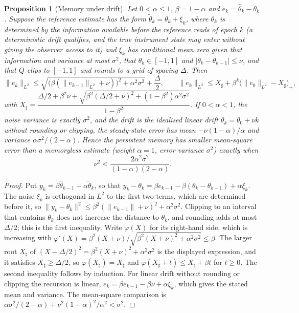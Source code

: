 \documentclass[12pt]{article}
\newtheorem{proposition}[theorem]{Proposition}
\theoremstyle{definition}
\begin{document}
\begin{proposition}[Memory under drift]\label{prop:memory_drift}
Let $0<\alpha\le1$, $\beta=1-\alpha$ and $e_k=\hat\theta_k-\theta_k$. Suppose the reference estimate has the form $\tilde\theta_k=\theta_k+\xi_k$, where $\theta_k$ is determined by the information available before the reference reads of epoch $k$ (a deterministic drift qualifies, and the true instrument state may enter without giving the observer access to it) and $\xi_k$ has conditional mean zero given that information and variance at most $\sigma^2$, that $\theta_k\in[-1,1]$ and $|\theta_k-\theta_{k-1}|\le\nu$, and that $Q$ clips to $[-1,1]$ and rounds to a grid of spacing $\Delta$. Then
\[
\|e_k\|_{L^2}\le\sqrt{\bigl(\beta(\|e_{k-1}\|_{L^2}+\nu)\bigr)^2+\alpha^2\sigma^2}+\frac\Delta2,
\qquad
\|e_k\|_{L^2}\le X_\sharp+\beta^k\bigl(\|e_0\|_{L^2}-X_\sharp\bigr)_+,
\]
with $X_\sharp=\dfrac{\Delta/2+\beta^2\nu+\sqrt{\beta^2(\Delta/2+\nu)^2+(1-\beta^2)\alpha^2\sigma^2}}{1-\beta^2}$. If $0<\alpha<1$, the noise variance is exactly $\sigma^2$, and the drift is the idealised linear drift $\theta_k=\theta_0+\nu k$ without rounding or clipping, the steady-state error has mean $-\nu(1-\alpha)/\alpha$ and variance $\alpha\sigma^2/(2-\alpha)$. Hence the persistent memory has smaller mean-square error than a memoryless estimate (weight $\alpha=1$, error variance $\sigma^2$) exactly when
\[
\nu^2<\frac{2\alpha^2\sigma^2}{(1-\alpha)(2-\alpha)}.
\]
\end{proposition}
\begin{proof}
Put $y_k=\beta\hat\theta_{k-1}+\alpha\tilde\theta_k$, so that $y_k-\theta_k=\beta e_{k-1}-\beta(\theta_k-\theta_{k-1})+\alpha\xi_k$. The noise $\xi_k$ is orthogonal in $L^2$ to the first two terms, which are determined before it, so $\|y_k-\theta_k\|^2\le\beta^2(\|e_{k-1}\|+\nu)^2+\alpha^2\sigma^2$. Clipping to an interval that contains $\theta_k$ does not increase the distance to $\theta_k$, and rounding adds at most $\Delta/2$; this is the first inequality. Write $\varphi(X)$ for its right-hand side, which is increasing with $\varphi'(X)=\beta^2(X+\nu)/\sqrt{\beta^2(X+\nu)^2+\alpha^2\sigma^2}\le\beta$. The larger root $X_\sharp$ of $(X-\Delta/2)^2=\beta^2(X+\nu)^2+\alpha^2\sigma^2$ is the displayed expression, and it satisfies $X_\sharp\ge\Delta/2$, so $\varphi(X_\sharp)=X_\sharp$ and $\varphi(X_\sharp+t)\le X_\sharp+\beta t$ for $t\ge0$. The second inequality follows by induction. For linear drift without rounding or clipping the recursion is linear, $e_k=\beta e_{k-1}-\beta\nu+\alpha\xi_k$, which gives the stated mean and variance. The mean-square comparison is $\alpha\sigma^2/(2-\alpha)+\nu^2(1-\alpha)^2/\alpha^2<\sigma^2$.
\end{proof}
\end{document}
